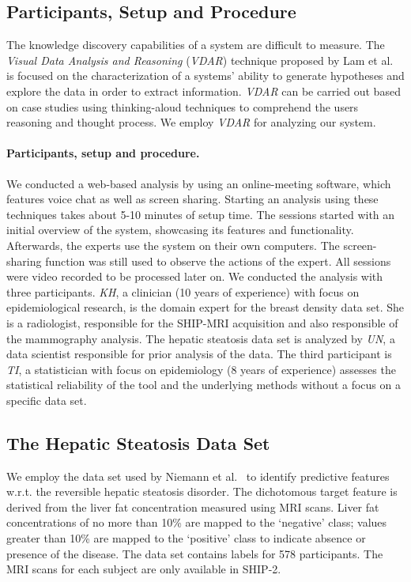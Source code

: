 \documentclass[journal]{style/vgtc} 			          %
\begin{document}
\subsection{Participants, Setup and Procedure}
The knowledge discovery capabilities of a system are difficult to measure.
The \emph{Visual Data Analysis and Reasoning} (\emph{VDAR}) technique proposed by Lam et al.~\cite{Lam2012} is focused on the characterization of a systems' ability to generate hypotheses and explore the data in order to extract information.
\emph{VDAR} can be carried out based on case studies using thinking-aloud techniques to comprehend the users reasoning and thought process.
We employ \emph{VDAR} for analyzing our system.
\paragraph{Participants, setup and procedure.}
We conducted a web-based analysis by using an online-meeting software, which features voice chat as well as screen sharing.
Starting an analysis using these techniques takes about 5-10 minutes of setup time.
The sessions started with an initial overview of the system, showcasing its features and functionality.
Afterwards, the experts use the system on their own computers.
The screen-sharing function was still used to observe the actions of the expert.
All sessions were video recorded to be processed later on.
We conducted the analysis with three participants.
\emph{KH}, a clinician (10 years of experience) with focus on epidemiological research, is the domain expert for the breast density data set.
She is a radiologist, responsible for the SHIP-MRI acquisition and also responsible of the mammography analysis.
The hepatic steatosis data set is analyzed by \emph{UN}, a data scientist responsible for prior analysis of the data.
The third participant is \emph{TI}, a statistician with focus on epidemiology (8 years of experience) assesses the statistical reliability of the tool and the underlying methods without a focus on a specific data set.
\subsection{The Hepatic Steatosis Data Set}
We employ the data set used by Niemann et al.~\cite{Niemann2014} to identify predictive features w.r.t. the reversible hepatic steatosis disorder.
The dichotomous target feature is derived from the liver fat concentration measured using MRI scans.
Liver fat concentrations of no more than 10\% are mapped to the `negative' class; values greater than 10\% are mapped to the `positive' class to indicate absence or presence of the disease.
The data set contains labels for 578 participants. %
The MRI scans for each subject are only available in SHIP-2. %
\end{document}
